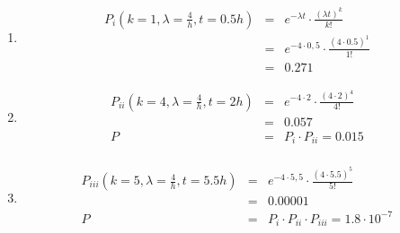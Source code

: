\documentclass{homework}
\begin{document}
\begin{enumerate}


\begin{enumerate}
\item \begin{eqnarray*}
P_i(k=1, \lambda = \frac{4}{h}, t=0.5h)
& = & e^{-\lambda t} \cdot \frac{(\lambda t)^k}{k!}\\
& = & e^{-4 \cdot 0,5} \cdot \frac{(4 \cdot 0.5)^1}{1!}\\
& = & 0.271
\end{eqnarray*}
\item \begin{eqnarray*}
P_{ii}(k=4, \lambda = \frac{4}{h}, t=2h)
& = & e^{-4 \cdot 2} \cdot \frac{(4 \cdot 2)^4}{4!}\\
& = & 0.057\\
P & = & P_i \cdot P_{ii} = 0.015\\
\end{eqnarray*}
\item \begin{eqnarray*}
P_{iii}(k=5, \lambda = \frac{4}{h}, t=5.5h)
& = & e^{-4 \cdot 5,5} \cdot \frac{(4 \cdot 5.5)^5}{5!}\\
& = & 0.00001\\
P & = & P_i \cdot P_{ii} \cdot P_{iii} = 1.8 \cdot 10^{-7}\\
\end{eqnarray*}
\end{enumerate}


\end{enumerate}
\end{document}
